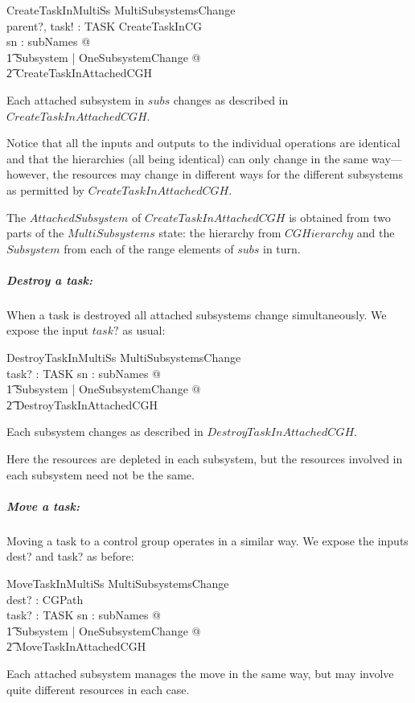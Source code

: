 \documentclass[a4paper,twoside,12pt]{article}
\begin{document}
\begin{schema}{CreateTaskInMultiSs}
MultiSubsystemsChange \\
parent?, task! : TASK
\where
CreateTaskInCG \\
\forall sn : subNames @ \\
\t1 \exists \Delta Subsystem | OneSubsystemChange @ \\
    \t2 CreateTaskInAttachedCGH
\end{schema}
Each attached subsystem in $subs$ changes as described in $CreateTaskInAttachedCGH$.

Notice that all the inputs and outputs to the individual operations are identical and that the hierarchies 
(all being identical)
can only change in the same way---however, the resources may change in different ways for the different subsystems as permitted by
$CreateTaskInAttachedCGH$.

The $AttachedSubsystem$ of $CreateTaskInAttachedCGH$ is obtained from two parts of the
$MultiSubsystems$ state: the hierarchy from $CGHierarchy$ and the $Subsystem$ from each of the
range elements of $subs$ in turn.

\subparagraph{Destroy a task:}

When a task is destroyed all attached subsystems change simultaneously. We expose the input $task?$ as usual:
\begin{schema}{DestroyTaskInMultiSs}
MultiSubsystemsChange \\
task? : TASK
\where
\forall sn : subNames @ \\
\t1 \exists \Delta Subsystem | OneSubsystemChange @ \\
    \t2 DestroyTaskInAttachedCGH
\end{schema}
Each subsystem changes as described in $DestroyTaskInAttachedCGH$.

Here the resources are depleted in each subsystem, but the resources involved in each subsystem need not be the same.

\subparagraph{Move a task:}

Moving a task to a control group operates in a similar way.  We expose the inputs dest? and task? as before:
\begin{schema}{MoveTaskInMultiSs}
MultiSubsystemsChange \\
dest? : CGPath \\
task? : TASK
\where
\forall sn : subNames @ \\
\t1 \exists \Delta Subsystem | OneSubsystemChange @ \\
    \t2 MoveTaskInAttachedCGH
\end{schema}
Each attached subsystem manages the move in the same way, but may involve quite different resources in each case.
\end{document}
